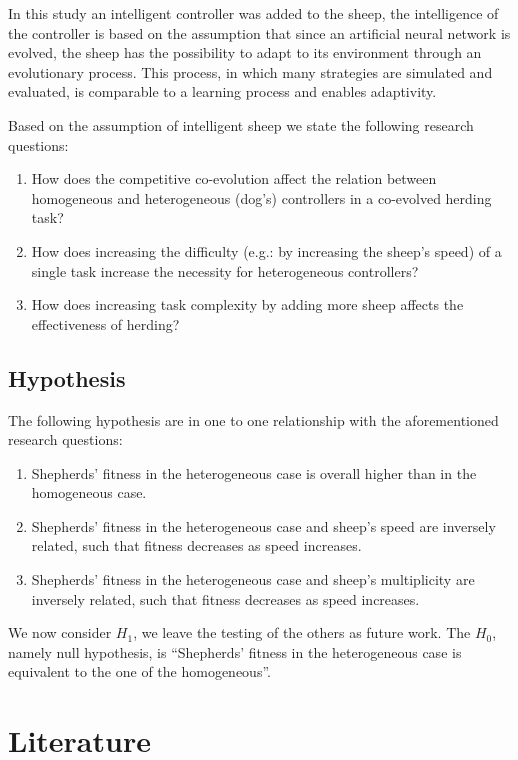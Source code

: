 \documentclass[conference]{IEEEtran}
\begin{document}
In this study an intelligent controller was added to the sheep, the intelligence of the controller is based on the assumption that since an artificial neural network is evolved, the sheep has the possibility to adapt to its environment through an evolutionary process. 
This process, in which many strategies are simulated and evaluated, is comparable to a learning process and enables adaptivity. 

Based on the assumption of intelligent sheep we state the following research questions:
 
\begin{enumerate}
	\item How does the competitive co-evolution affect the relation between homogeneous and heterogeneous (dog’s) controllers in a co-evolved herding task?
	\item How does increasing the difficulty (e.g.: by increasing the sheep’s speed) of a single task increase the necessity for heterogeneous controllers?
	\item How does increasing task complexity by adding more sheep affects the effectiveness of herding?
\end{enumerate}

\subsection{Hypothesis}
\label{sec:hypothesis}
The following hypothesis are in one to one relationship with the aforementioned research questions:

\begin{enumerate}
	\item Shepherds’ fitness in the heterogeneous case is overall higher than in the homogeneous case.
	\item Shepherds’ fitness in the heterogeneous case and sheep’s speed are inversely related, such that fitness decreases as speed increases.
	\item Shepherds’ fitness in the heterogeneous case and sheep’s multiplicity are inversely related, such that fitness decreases as speed increases.
\end{enumerate}

We now consider $H_1$, we leave the testing of the others as future work. The $H_0$, namely null hypothesis, is ``Shepherds’ fitness in the heterogeneous case is equivalent to the one of the homogeneous''.

\section{Literature}
 
\end{document}

